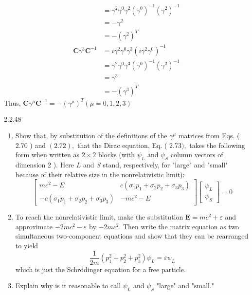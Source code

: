 \documentclass{article}
\begin{document}
\begin{flushleft}
$$\begin{aligned}
&=\gamma^{2} \gamma^{0} \gamma^{2}\left(\gamma^{0}\right)^{-1}\left(\gamma^{2}\right)^{-1} \\
&=-\gamma^{2} \\
&=-\left(\gamma^{2}\right)^{T} \\
\mathbf{C} \gamma^{3} \mathbf{C}^{-1} &=i \gamma^{2} \gamma^{0} \gamma^{3}\left(i \gamma^{2} \gamma^{0}\right)^{-1} \\
&=\gamma^{2} \gamma^{0} \gamma^{3}\left(\gamma^{0}\right)^{-1}\left(\gamma^{2}\right)^{-1} \\
&=\gamma^{3} \\
&=-\left(\gamma^{3}\right)^{T}
\end{aligned}
$$
Thus, $\mathbf{C} \gamma^{\mu} \mathbf{C}^{-1}=-\left(\gamma^{\mu}\right)^{T}(\mu=0,1,2,3)$



\begin{mybox}{2.2.48}
\begin{enumerate}[$(a)$]
\item Show that, by substitution of the definitions of the $\gamma^{\mu}$ matrices from Eqs. ( 2.70 ) and $(2.72),$ that the Dirac equation, Eq. ( 2.73$),$ takes the following form when written as $2 \times 2$ blocks (with $\psi_{L}$ and $\psi_{S}$ column vectors of dimension 2 ). Here $L$ and $S$ stand, respectively, for "large" and "small" because of their relative size in the nonrelativistic limit):
$$
\begin{bmatrix}
m c^{2}-E & c\left(\sigma_{1} p_{1}+\sigma_{2} p_{2}+\sigma_{3} p_{3}\right) \\
-c\left(\sigma_{1} p_{1}+\sigma_{2} p_{2}+\sigma_{3} p_{3}\right) & -m c^{2}-E
\end{bmatrix}\begin{bmatrix}
\psi_{L} \\
\psi_{S}
\end{bmatrix}=0
$$
\item To reach the nonrelativistic limit, make the substitution $\mathbf{E}=m c^{2}+\varepsilon$ and approximate $-2 m c^{2}-\varepsilon$ by $-2 m c^{2}$. Then write the matrix equation as two simultaneous two-component equations and show that they can be rearranged to yield
$$
\frac{1}{2 m}\left(p_{1}^{2}+p_{2}^{2}+p_{3}^{2}\right) \psi_{L}=\varepsilon \psi_{L}
$$
which is just the Schrödinger equation for a free particle.
\item Explain why is it reasonable to call $\psi_{L}$ and $\psi_{S}$ "large" and "small."
\end{enumerate}
\end{mybox}




\end{flushleft}
\end{document}
